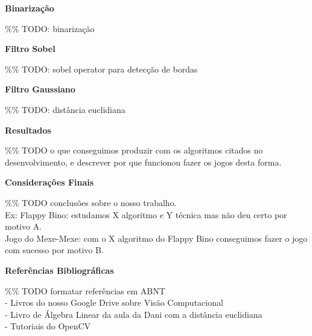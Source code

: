\documentclass[a4paper]{article}
\begin{document}
\begin{flushleft}
\textbf{\large Binarização}
\end{flushleft}
\%\% TODO: binarização

\begin{flushleft}
\textbf{\large Filtro Sobel}
\end{flushleft}
\%\% TODO: sobel operator para detecção de bordas

\begin{flushleft}
\textbf{\large Filtro Gaussiano}
\end{flushleft}
\%\% TODO: distância euclidiana



\break

\begin{center}
\textbf{\Large Resultados}
\end{center}

\%\% TODO o que conseguimos produzir com os algoritmos citados no desenvolvimento, e descrever por que funcionou fazer os jogos desta forma. 

\break

\begin{center}
\textbf{\Large Considerações Finais}
\end{center}

\%\% TODO conclusões sobre o nosso trabalho.\\

Ex: Flappy Bino: estudamos X algoritmo e Y técnica mas não deu certo por motivo A.\\

Jogo do Mexe-Mexe: com o X algoritmo do Flappy Bino conseguimos fazer o jogo com sucesso por motivo B.

\break

\begin{center}
\textbf{\Large Referências Bibliográficas}
\end{center}

\%\% TODO formatar referências em ABNT \\
- Livros do nosso Google Drive sobre Visão Computacional \\
- Livro de Álgebra Linear da aula da Dani com a distância euclidiana \\
- Tutoriais do OpenCV \\


\break
\end{document}
